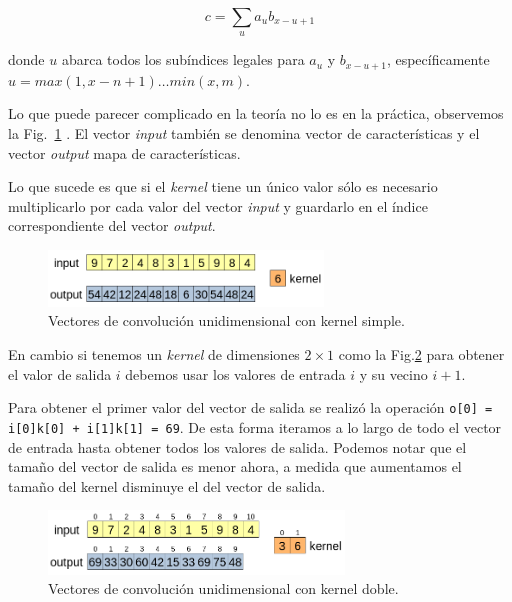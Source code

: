 \documentclass[a4paper,12pt]{article}
\begin{document}
$$ c = \sum_{u} a_u b_{x-u+1}$$

donde $u$ abarca todos los subíndices legales para $a_u$ y $b_{x-u+1}$, específicamente $u=max(1, x-n+1)\dots min(x,m).$

Lo que puede parecer complicado en la teoría no lo es en la práctica, observemos la Fig.~\ref{fig:conv1dk1} \citep{Cogneethi2019Aug}. El vector \textit{input} también se denomina vector de características y el vector \textit{output} mapa de características.

Lo que sucede es que si el \textit{kernel} tiene un único valor sólo es necesario multiplicarlo por cada valor del vector \textit{input} y guardarlo en el índice correspondiente del vector \textit{output}.

\begin{figure}[H]
	\begin{center}				
		\includegraphics[width=0.65\textwidth]{tesis_24.png}
		\caption{Vectores de convolución unidimensional con kernel simple.}
		\label{fig:conv1dk1}
	\end{center}
\end{figure}

En cambio si tenemos un \textit{kernel} de dimensiones $2 \times 1$ como la Fig.\ref{fig:conv1dk2} para obtener el valor de salida $i$ debemos usar los valores de entrada $i$ y su vecino $i+1$.

Para obtener el primer valor del vector de salida se realizó la operación \texttt{o[0] = i[0]k[0] + i[1]k[1] = 69}. De esta forma iteramos a lo largo de todo el vector de entrada hasta obtener todos los valores de salida. Podemos notar que el tamaño del vector de salida es menor ahora, a medida que aumentamos el tamaño del kernel disminuye el del vector de salida.

\begin{figure}[H]
	\begin{center}				
		\includegraphics[width=0.7\textwidth]{tesis_25.png}
		\caption{Vectores de convolución unidimensional con kernel doble.}
		\label{fig:conv1dk2}
	\end{center}
\end{figure}
\end{document}
